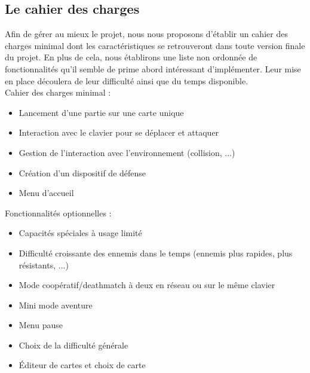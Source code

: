 \subsection{Le cahier des charges}

Afin de gérer au mieux le projet, nous nous proposons d’établir un cahier des charges minimal dont les
caractéristiques se retrouveront dans toute version finale du projet. En plus de cela, nous établirons une liste
non ordonnée de fonctionnalités qu’il semble de prime abord intéressant d’implémenter. Leur mise en place
découlera de leur difficulté ainsi que du temps disponible. \\
Cahier des charges minimal :
\begin{itemize}
\item Lancement d’une partie sur une carte unique
\item Interaction avec le clavier pour se déplacer et attaquer
\item Gestion de l’interaction avec l’environnement (collision, ...)
\item Création d’un dispositif de défense
\item Menu d’accueil
\end{itemize}
Fonctionnalités optionnelles :
\begin{itemize}
\item Capacités spéciales à usage limité
\item Difficulté croissante des ennemis dans le temps (ennemis plus rapides, plus résistants, ...)
\item Mode coopératif/deathmatch à deux en réseau ou sur le même clavier
\item Mini mode aventure
\item Menu pause
\item Choix de la difficulté générale
\item Éditeur de cartes et choix de carte
\end{itemize}